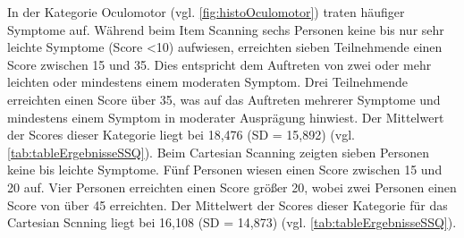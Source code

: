 In der Kategorie Oculomotor (vgl. \autoref{fig:histoOculomotor}) traten häufiger Symptome auf. Während beim Item Scanning sechs Personen keine bis nur sehr leichte Symptome (Score <10) aufwiesen, erreichten sieben Teilnehmende einen Score zwischen 15 und 35. Dies entspricht dem Auftreten von zwei oder mehr leichten oder mindestens einem moderaten Symptom. Drei Teilnehmende erreichten einen Score über 35, was auf das Auftreten mehrerer Symptome und mindestens einem Symptom in moderater Ausprägung hinwiest. Der Mittelwert der Scores dieser Kategorie liegt bei 18,476 (SD = 15,892) (vgl. \autoref{tab:tableErgebnisseSSQ}). Beim Cartesian Scanning zeigten sieben Personen keine bis leichte Symptome. Fünf Personen wiesen einen Score zwischen 15 und 20 auf. Vier Personen erreichten einen Score größer 20, wobei zwei Personen einen Score von über 45 erreichten. Der Mittelwert der Scores dieser Kategorie für das Cartesian Scnning liegt bei 16,108 (SD = 14,873) (vgl. \autoref{tab:tableErgebnisseSSQ}).

